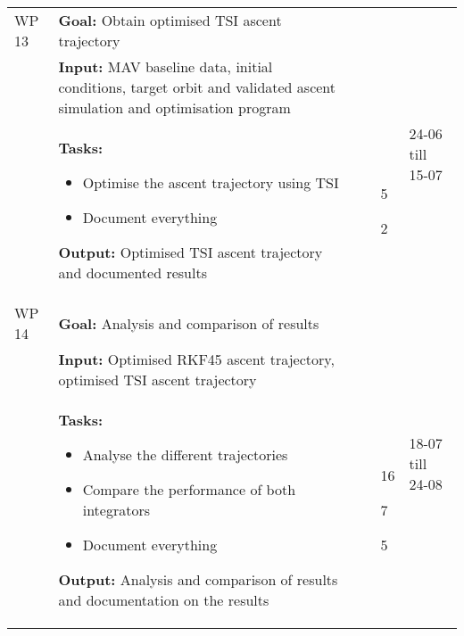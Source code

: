 \pagebreak
\begin{longtable}{|p{2cm}|p{10cm}|p{1cm}|p{1cm}|}
\hline
WP 13 & \textbf{Goal:} Obtain optimised \ac{TSI} ascent trajectory &  & \multirow{3}{1cm}{24-06 till 15-07}  \\ 
&\textbf{Input:} MAV baseline data, initial conditions, target orbit and validated ascent simulation and optimisation program & & \\
& \textbf{Tasks:}
\begin{itemize}
\item Optimise the ascent trajectory using \ac{TSI}
\item Document everything
\end{itemize} 
\textbf{Output:} Optimised \ac{TSI} ascent trajectory and documented results & \noindent \begin{itemize}[leftmargin=*]
\item[5] 
\item[2]
\end{itemize} & \\ \hline


WP 14 & \textbf{Goal:} Analysis and comparison of results &  & \multirow{3}{1cm}{18-07 till 24-08} \\ 
&\textbf{Input:} Optimised \ac{RKF45} ascent trajectory, optimised \ac{TSI} ascent trajectory & & \\
& \textbf{Tasks:}
\begin{itemize}
\item Analyse the different trajectories
\item Compare the performance of both integrators
\item Document everything
\end{itemize} 
\textbf{Output:} Analysis and comparison of results and documentation on the results & \noindent \begin{itemize}[leftmargin=*]
\item[16]
\item[7] 
\item[5]
\end{itemize} & \\ \hline


\end{longtable}
